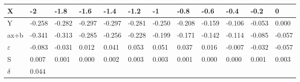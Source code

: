 \begin{longtable}[c]{|l|lllllllllll|}
\hline
X &
  \multicolumn{1}{l|}{-2} &
  \multicolumn{1}{l|}{-1.8} &
  \multicolumn{1}{l|}{-1.6} &
  \multicolumn{1}{l|}{-1.4} &
  \multicolumn{1}{l|}{-1.2} &
  \multicolumn{1}{l|}{-1} &
  \multicolumn{1}{l|}{-0.8} &
  \multicolumn{1}{l|}{-0.6} &
  \multicolumn{1}{l|}{-0.4} &
  \multicolumn{1}{l|}{-0.2} &
  0 \\ \hline
\endfirsthead
%
\endhead
%
Y &
  \multicolumn{1}{l|}{-0.258} &
  \multicolumn{1}{l|}{-0.282} &
  \multicolumn{1}{l|}{-0.297} &
  \multicolumn{1}{l|}{-0.297} &
  \multicolumn{1}{l|}{-0.281} &
  \multicolumn{1}{l|}{-0.250} &
  \multicolumn{1}{l|}{-0.208} &
  \multicolumn{1}{l|}{-0.159} &
  \multicolumn{1}{l|}{-0.106} &
  \multicolumn{1}{l|}{-0.053} &
  0.000 \\ \hline
ax+b &
  \multicolumn{1}{l|}{-0.341} &
  \multicolumn{1}{l|}{-0.313} &
  \multicolumn{1}{l|}{-0.285} &
  \multicolumn{1}{l|}{-0.256} &
  \multicolumn{1}{l|}{-0.228} &
  \multicolumn{1}{l|}{-0.199} &
  \multicolumn{1}{l|}{-0.171} &
  \multicolumn{1}{l|}{-0.142} &
  \multicolumn{1}{l|}{-0.114} &
  \multicolumn{1}{l|}{-0.085} &
  -0.057 \\ \hline
$\varepsilon$ &
  \multicolumn{1}{l|}{-0.083} &
  \multicolumn{1}{l|}{-0.031} &
  \multicolumn{1}{l|}{0.012} &
  \multicolumn{1}{l|}{0.041} &
  \multicolumn{1}{l|}{0.053} &
  \multicolumn{1}{l|}{0.051} &
  \multicolumn{1}{l|}{0.037} &
  \multicolumn{1}{l|}{0.016} &
  \multicolumn{1}{l|}{-0.007} &
  \multicolumn{1}{l|}{-0.032} &
  -0.057 \\ \hline
S &
  \multicolumn{1}{l|}{0.007} &
  \multicolumn{1}{l|}{0.001} &
  \multicolumn{1}{l|}{0.000} &
  \multicolumn{1}{l|}{0.002} &
  \multicolumn{1}{l|}{0.003} &
  \multicolumn{1}{l|}{0.003} &
  \multicolumn{1}{l|}{0.001} &
  \multicolumn{1}{l|}{0.000} &
  \multicolumn{1}{l|}{0.000} &
  \multicolumn{1}{l|}{0.001} &
  0.003 \\ \hline
$\delta$ & \multicolumn{11}{l|}{0.044}    \\ \hline
\end{longtable}
